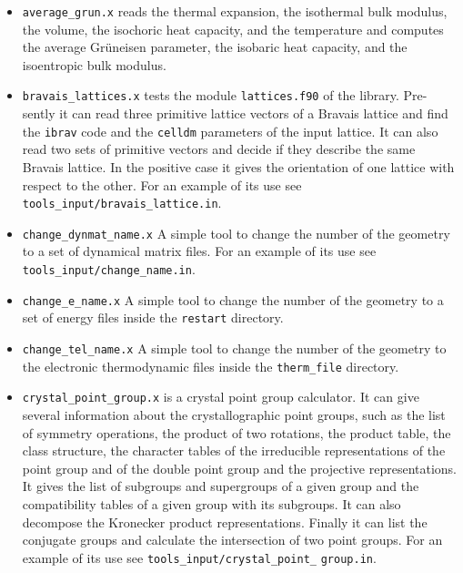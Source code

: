 \documentclass[12pt,a4paper,twoside]{report}
\begin{document}
\begin{itemize}

\item \texttt{average\_grun.x} reads the thermal expansion, 
the isothermal bulk modulus, the volume, the isochoric heat capacity,
and the temperature and computes the average Gr\"uneisen parameter,
the isobaric heat capacity, and the isoentropic bulk modulus.

\item \texttt{bravais\_lattices.x} tests the
module \texttt{lattices.f90} of the library. Pre- sently it can read three
primitive lattice vectors of a Bravais lattice and find the \texttt{ibrav}
code and the \texttt{celldm} parameters of the input lattice. It
can also read two sets of primitive vectors and decide if they describe
the same Bravais lattice. In the positive case it gives the orientation
of one lattice with respect to the other.
For an example of its use see \texttt{tools\_input/bravais\_lattice.in}.

\item \texttt{change\_dynmat\_name.x} A simple tool 
to change the number of the geometry to a set of dynamical matrix files. 
For an example of its use see \texttt{tools\_input/change\_name.in}.

\item \texttt{change\_e\_name.x} A simple tool to change the number of the 
geometry to a set of energy files inside the \texttt{restart} directory. 

\item \texttt{change\_tel\_name.x} A simple tool to change the number of the 
geometry to the electronic thermodynamic files inside the \texttt{therm\_file} 
directory. 

\item \texttt{crystal\_point\_group.x} is a crystal point group calculator.
It can give several information about the crystallographic point groups,
such as the list of symmetry operations, the product of two rotations,
the product table, the class structure, the character tables of 
the irreducible representations of the point group and of the double
point group and the projective representations. It
gives the list of subgroups and supergroups of a given group and 
the compatibility tables of a given group with its subgroups. It can 
also decompose the Kronecker product representations. Finally it
can list the conjugate groups and calculate the intersection of two
point groups.
For an example of its use see \texttt{tools\_input/crystal\_point\_}
\texttt{group.in}.


\end{itemize}
\end{document}
